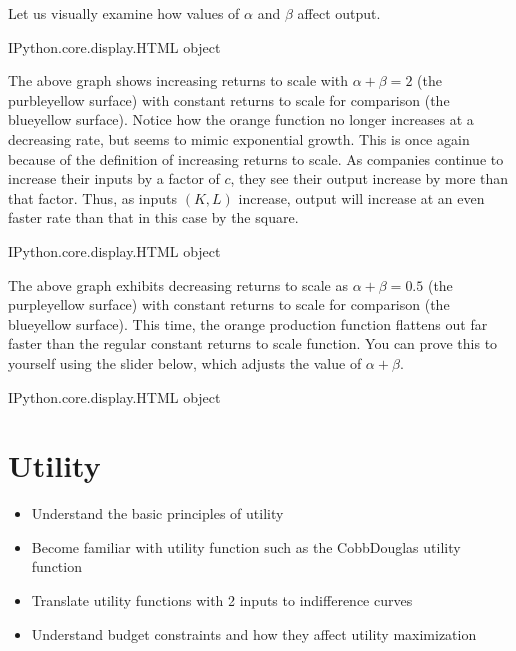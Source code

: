 \documentclass[letterpaper,10pt,english]{jupyterBook}
\begin{document}
\sphinxAtStartPar
Let us visually examine how values of \(\alpha\) and \(\beta\) affect output.

\begin{sphinxVerbatim}[commandchars=\\\{\}]
\PYGZlt{}IPython.core.display.HTML object\PYGZgt{}
\end{sphinxVerbatim}

\sphinxAtStartPar
The above graph shows increasing returns to scale with \(\alpha + \beta = 2\) (the purble\sphinxhyphen{}yellow surface) with constant returns to scale for comparison (the blue\sphinxhyphen{}yellow surface). Notice how the orange function no longer increases at a decreasing rate, but seems to mimic exponential growth. This is once again because of the definition of increasing returns to scale. As companies continue to increase their inputs by a factor of \(c\), they see their output increase by more than that factor. Thus, as inputs \((K, L)\) increase, output will increase at an even faster rate than that \sphinxhyphen{} in this case by the square.

\begin{sphinxVerbatim}[commandchars=\\\{\}]
\PYGZlt{}IPython.core.display.HTML object\PYGZgt{}
\end{sphinxVerbatim}

\sphinxAtStartPar
The above graph exhibits decreasing returns to scale as \(\alpha + \beta = 0.5\) (the purple\sphinxhyphen{}yellow surface) with constant returns to scale for comparison (the blue\sphinxhyphen{}yellow surface). This time, the orange production function flattens out far faster than the regular constant returns to scale function. You can prove this to yourself using the slider below, which adjusts the value of \(\alpha + \beta\).

\begin{sphinxVerbatim}[commandchars=\\\{\}]
\PYGZlt{}IPython.core.display.HTML object\PYGZgt{}
\end{sphinxVerbatim}


\section{Utility}
\label{\detokenize{content/05-utility/index:utility}}\label{\detokenize{content/05-utility/index::doc}}
\sphinxAtStartPar
{}
\begin{itemize}
\item {} 
\sphinxAtStartPar
Understand the basic principles of utility

\item {} 
\sphinxAtStartPar
Become familiar with utility function such as the Cobb\sphinxhyphen{}Douglas utility function

\item {} 
\sphinxAtStartPar
Translate utility functions with 2 inputs to indifference curves

\item {} 
\sphinxAtStartPar
Understand budget constraints and how they affect utility maximization

\end{itemize}
\end{document}
